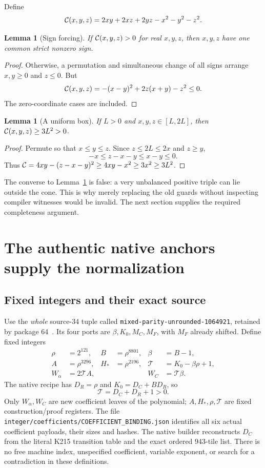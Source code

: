 \documentclass[11pt]{article}
\newtheorem{lemma}[theorem]{Lemma}
\theoremstyle{remark}\newtheorem{remark}[theorem]{Remark}
\begin{document}
Define
\begin{equation}\label{eq:cone}
 \mathcal C(x,y,z)=2xy+2xz+2yz-x^2-y^2-z^2.
\end{equation}

\begin{lemma}[Sign forcing]\label{lem:sign}
If $\mathcal C(x,y,z)>0$ for real $x,y,z$, then $x,y,z$ have one common strict nonzero sign.
\end{lemma}
\begin{proof}
Otherwise, a permutation and simultaneous change of all signs arrange $x,y\ge0$ and $z\le0$. But
\[
 \mathcal C(x,y,z)=-(x-y)^2+2z(x+y)-z^2\le0.
\]
The zero-coordinate cases are included.
\end{proof}

\begin{lemma}[A uniform box]\label{lem:box}
If $L>0$ and $x,y,z\in[L,2L]$, then $\mathcal C(x,y,z)\ge3L^2>0$.
\end{lemma}
\begin{proof}
Permute so that $x\le y\le z$. Since $z\le2L\le2x$ and $z\ge y$,
\[
 -x\le z-x-y\le x-y\le0.
\]
Thus $\mathcal C=4xy-(z-x-y)^2\ge4xy-x^2\ge3x^2\ge3L^2$.
\end{proof}

The converse to Lemma~\ref{lem:sign} is false: a very unbalanced positive triple can lie outside the cone. This is why merely replacing the old guards without inspecting compiler witnesses would be invalid. The next section supplies the required completeness argument.

\section{The authentic native anchors supply the normalization}\label{sec:anchors}

\subsection{Fixed integers and their exact source}

Use the \emph{whole} source-34 tuple called \texttt{mixed-parity-unrounded-1064921}, retained by package 64~\cite{source34,q41}. Its four ports are $\beta,K_0,M_C,M_F$, with $M_F$ already shifted. Define fixed integers
\begin{align*}
 \rho&=2^{121}, & B&=\rho^{8801}, & \beta&=B-1,\\
 A&=\rho^{3296}, & H_*&=\rho^{2196}, &
 \mathcal T&=K_0-\beta\rho+1,\\
 W_\alpha&=2\mathcal T A, &&& W_C&=\mathcal T\beta.
\end{align*}
The native recipe has $D_R=\rho$ and $K_0=D_C+BD_R$, so
\[
 \mathcal T=D_C+D_R+1>0.
\]
Only $W_\alpha,W_C$ are new coefficient leaves of the polynomial; $A,H_*,\rho,\mathcal T$ are fixed construction/proof registers. The file \texttt{integer/coefficients/COEFFICIENT\_BINDING.json} identifies all six actual coefficient payloads, their sizes and hashes. The native builder reconstructs $D_C$ from the literal K215 transition table and the exact ordered 943-tile list. There is no free machine index, unspecified coefficient, variable exponent, or search for a contradiction in these definitions.
\end{document}
